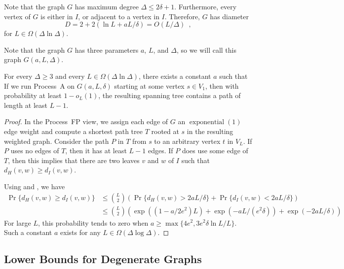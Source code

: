 \documentclass[lotsofwhite]{patmorin}
\DeclareMathOperator{\exponential}{exponential}
\begin{document}
Note that the graph $G$ has maximum degree $\Delta\le 2\delta+1$.
Furthermore, every vertex of $G$ is either in $I$, or adjacent to a
vertex in $I$.  Therefore, $G$ has diameter
\[
    D = 2+2(\ln L + aL/\delta) = O(L/\Delta) \enspace ,
\]
for $L\in\Omega(\Delta\ln\Delta)$.

Note that the graph $G$ has three parameters $a$, $L$, and $\Delta$,
so we will call this graph $G(a,L,\Delta)$.
%
\begin{thm}
  For every $\Delta\ge 3$ and every $L\in\Omega(\Delta\ln\Delta)$, there
  exists a constant $a$ such that If we run Process~A on $G(a,L,\delta)$
  starting at some vertex $s\in V_1$, then with probability at least
  $1-o_L(1)$, the resulting spanning tree contains a path of length at
  least $L-1$.
\end{thm}

\begin{proof}
  In the Process~FP view, we assign each edge of $G$ an $\exponential(1)$
  edge weight and compute a shortest path tree $T$ rooted at $s$ in
  the resulting weighted graph.  Consider the path $P$ in $T$ from $s$
  to an arbitrary vertex $t$ in $V_L$.  If $P$ uses no edges of $T$,
  then it has at least $L-1$ edges.  If $P$ does use some edge of $T$,
  then this implies that there are two leaves $v$ and $w$ of $I$ such
  that $d_H(v,w) \ge d_I(v,w)$.

  Using  and , we have
  \begin{align*}
     \Pr\{d_H(v,w) \ge d_I(v,w)\}
       & \le \binom{L}{2}\left(\Pr\{d_H(v,w) > 2aL/\delta\} + \Pr\{d_I(v,w) < 2aL/\delta\}\right)  \\
       & \le \binom{L}{2}\left(\exp((1-a/2e^2)L) 
                + \exp(-aL/(e^2\delta)) 
                + \exp(-2aL/\delta)
              \right)
  \end{align*}
  For large $L$, this probability tends to zero when $a\ge \max\{4e^2, 3e^2\delta\ln L/L\}$.  Such a constant $a$ exists for any $L\in\Omega(\Delta\log\Delta)$.
\end{proof}

\subsection{Lower Bounds for Degenerate Graphs}
\end{document}

